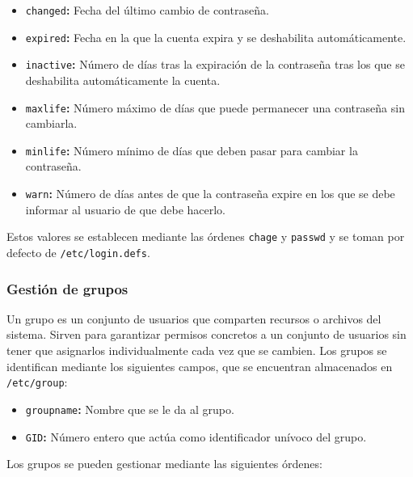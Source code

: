 \begin{itemize}
	\item\texttt{changed}\textbf{:} Fecha del último cambio de contraseña.
	\item\texttt{expired}\textbf{:} Fecha en la que la cuenta expira y se deshabilita automáticamente.
	\item\texttt{inactive}\textbf{:} Número de días tras la expiración de la contraseña tras los que se deshabilita automáticamente la cuenta.
	\item\texttt{maxlife}\textbf{:} Número máximo de días que puede permanecer una contraseña sin cambiarla.
	\item\texttt{minlife}\textbf{:} Número mínimo de días que deben pasar para cambiar la contraseña.
	\item\texttt{warn}\textbf{:} Número de días antes de que la contraseña expire en los que se debe informar al usuario de que debe hacerlo.
\end{itemize}

Estos valores se establecen mediante las órdenes \texttt{chage} y \texttt{passwd} y se toman por defecto de \texttt{/etc/login.defs}.

\subsubsection{Gestión de grupos}

Un grupo es un conjunto de usuarios que comparten recursos o archivos del sistema.
Sirven para garantizar permisos concretos a un conjunto de usuarios sin tener que asignarlos individualmente cada vez que se cambien.
Los grupos se identifican mediante los siguientes campos, que se encuentran almacenados en \texttt{/etc/group}:

\begin{itemize}
	\item\texttt{groupname}\textbf{:} Nombre que se le da al grupo.
	\item\texttt{GID}\textbf{:} Número entero que actúa como identificador unívoco del grupo.
\end{itemize}

\pagebreak

Los grupos se pueden gestionar mediante las siguientes órdenes:

